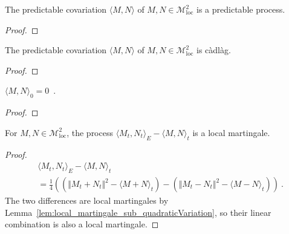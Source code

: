 \begin{lemma}\label{lem:predictable_covariation}
  \leanok
The predictable covariation $\langle M, N \rangle$ of $M, N \in \mathcal{M}^2_{\mathrm{loc}}$ is a predictable process.
\end{lemma}

\begin{proof}\leanok

\end{proof}


\begin{lemma}\label{lem:cadlag_covariation}
  \leanok
The predictable covariation $\langle M, N \rangle$ of $M, N \in \mathcal{M}^2_{\mathrm{loc}}$ is càdlàg.
\end{lemma}

\begin{proof}\leanok

\end{proof}


\begin{lemma}\label{lem:covariation_zero}
$\langle M, N \rangle_0 = 0$~.
\end{lemma}

\begin{proof}

\end{proof}


\begin{lemma}\label{lem:local_martingale_sub_covariation}
For $M, N \in \mathcal{M}^2_{\mathrm{loc}}$, the process $\langle M_t, N_t \rangle_E - \langle M, N \rangle_t$ is a local martingale.
\end{lemma}

\begin{proof}
\begin{align*}
  &\langle M_t, N_t \rangle_E - \langle M, N \rangle_t
  \\
  &= \frac{1}{4}\left( \left(\Vert M_t + N_t \Vert^2 - \langle M+N \rangle_t\right) - \left(\Vert M_t - N_t \Vert^2 - \langle M-N \rangle_t\right) \right)
  \: .
\end{align*}
The two differences are local martingales by Lemma~\ref{lem:local_martingale_sub_quadraticVariation}, so their linear combination is also a local martingale.
\end{proof}


